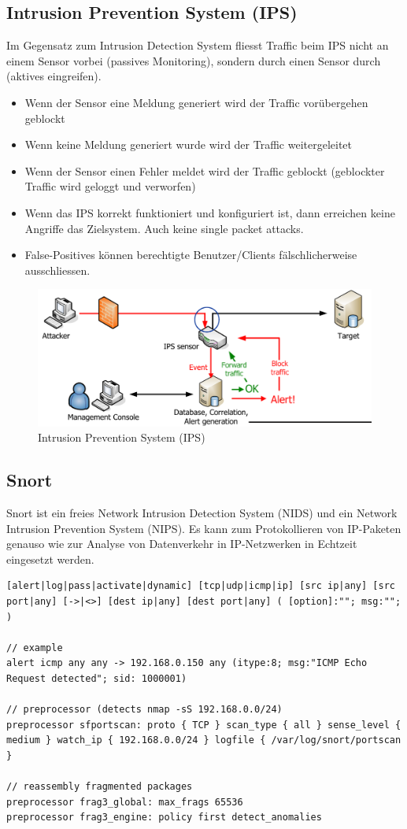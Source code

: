 \subsection{Intrusion Prevention System (IPS)}
Im Gegensatz zum Intrusion Detection System fliesst Traffic beim IPS nicht an einem Sensor vorbei (passives Monitoring), sondern durch einen Sensor durch (aktives eingreifen).
\begin{itemize}
    \item Wenn der Sensor eine Meldung generiert wird der Traffic vorübergehen geblockt
    \item Wenn keine Meldung generiert wurde wird der Traffic weitergeleitet
    \item Wenn der Sensor einen Fehler meldet wird der Traffic geblockt (geblockter Traffic wird geloggt und verworfen)
    \item Wenn das IPS korrekt funktioniert und konfiguriert ist, dann erreichen keine Angriffe das Zielsystem. Auch keine single packet attacks.
    \item False-Positives können berechtigte Benutzer/Clients fälschlicherweise ausschliessen.
\end{itemize}
\begin{figure}[h]
\centering
\includegraphics[width=0.5\linewidth]{images/intrusion_prevention_system.png}
\caption{Intrusion Prevention System (IPS)}
\label{fig:ips}
\end{figure}



\subsection{Snort}
Snort ist ein freies Network Intrusion Detection System (NIDS) und ein Network Intrusion Prevention System (NIPS). Es kann zum Protokollieren von IP-Paketen genauso wie zur Analyse von Datenverkehr in IP-Netzwerken in Echtzeit eingesetzt werden. 

\begin{lstlisting}
[alert|log|pass|activate|dynamic] [tcp|udp|icmp|ip] [src ip|any] [src port|any] [->|<>] [dest ip|any] [dest port|any] ( [option]:""; msg:""; )

// example
alert icmp any any -> 192.168.0.150 any (itype:8; msg:"ICMP Echo Request detected"; sid: 1000001)

// preprocessor (detects nmap -sS 192.168.0.0/24)
preprocessor sfportscan: proto { TCP } scan_type { all } sense_level { medium } watch_ip { 192.168.0.0/24 } logfile { /var/log/snort/portscan }

// reassembly fragmented packages
preprocessor frag3_global: max_frags 65536 
preprocessor frag3_engine: policy first detect_anomalies
\end{lstlisting}


